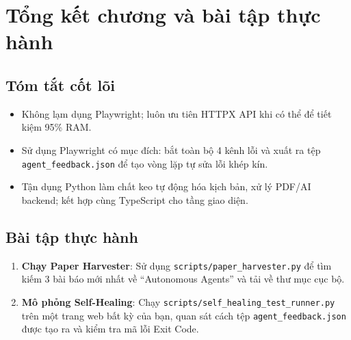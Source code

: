 \documentclass[a4paper,11pt]{article}
\begin{document}
\section{Tổng kết chương và bài tập thực hành}

\subsection{Tóm tắt cốt lõi}
\begin{itemize}[leftmargin=1.5em]
    \item Không lạm dụng Playwright; luôn ưu tiên HTTPX API khi có thể để tiết kiệm 95\% RAM.
    \item Sử dụng Playwright có mục đích: bắt toàn bộ 4 kênh lỗi và xuất ra tệp \texttt{agent\_feedback.json} để tạo vòng lặp tự sửa lỗi khép kín.
    \item Tận dụng Python làm chất keo tự động hóa kịch bản, xử lý PDF/AI backend; kết hợp cùng TypeScript cho tầng giao diện.
\end{itemize}

\subsection{Bài tập thực hành}
\begin{enumerate}[label={\arabic*.}]
    \item \textbf{Chạy Paper Harvester}: Sử dụng \texttt{scripts/paper\_harvester.py} để tìm kiếm 3 bài báo mới nhất về ``Autonomous Agents'' và tải về thư mục cục bộ.
    \item \textbf{Mô phỏng Self-Healing}: Chạy \texttt{scripts/self\_healing\_test\_runner.py} trên một trang web bất kỳ của bạn, quan sát cách tệp \texttt{agent\_feedback.json} được tạo ra và kiểm tra mã lỗi Exit Code.
\end{enumerate}
\end{document}
